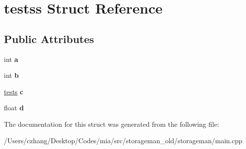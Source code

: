 \hypertarget{structtestss}{\section{testss Struct Reference}
\label{structtestss}
}
\subsection*{Public Attributes}
\begin{DoxyCompactItemize}
\item 
\hypertarget{structtestss_ae916d1791f70d60e93ce69d8e05fe316}{int {\bfseries a}}\label{structtestss_ae916d1791f70d60e93ce69d8e05fe316}

\item 
\hypertarget{structtestss_a3e01b19d3e897747e8153f9bc5994fe5}{int {\bfseries b}}\label{structtestss_a3e01b19d3e897747e8153f9bc5994fe5}

\item 
\hypertarget{structtestss_a7ce28bf11e1e05ebd4876bf23d01d523}{\hyperlink{structtests}{tests} {\bfseries c}}\label{structtestss_a7ce28bf11e1e05ebd4876bf23d01d523}

\item 
\hypertarget{structtestss_aaf1c0ca6a5bbc166817293e9001f2d04}{float {\bfseries d}}\label{structtestss_aaf1c0ca6a5bbc166817293e9001f2d04}

\end{DoxyCompactItemize}


The documentation for this struct was generated from the following file\-:\begin{DoxyCompactItemize}
\item 
/\-Users/czhang/\-Desktop/\-Codes/mia/src/storageman\-\_\-old/storageman/main.\-cpp\end{DoxyCompactItemize}

